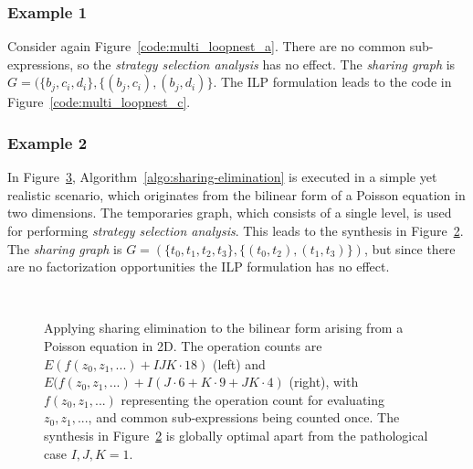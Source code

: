 \subsubsection{Example 1}
Consider again Figure~\ref{code:multi_loopnest_a}. There are no common sub-expressions, so the {\em strategy selection analysis} has no effect. The {\em sharing graph} is $G = (\lbrace b_j, c_i, d_i \rbrace, \lbrace (b_j, c_i), (b_j, d_i) \rbrace$. The ILP formulation leads to the code in Figure~\ref{code:multi_loopnest_c}.

\subsubsection{Example 2}
In Figure~\ref{code:poisson}, Algorithm~\ref{algo:sharing-elimination} is executed in a simple yet realistic scenario, which originates from the bilinear form of a Poisson equation in two dimensions. The temporaries graph, which consists of a single level, is used for performing {\em strategy selection analysis}. This leads to the synthesis in Figure~\ref{code:poisson_b}. The {\em sharing graph} is $G = (\lbrace t_0, t_1, t_2, t_3 \rbrace, \lbrace (t_0, t_2), (t_1, t_3) \rbrace)$, but since there are no factorization opportunities the ILP formulation has no effect.

\begin{figure}[h]
\begin{CenteredBox}
\begin{subfigure}{0.40\textwidth}

\label{code:poisson_a}
\end{subfigure}
~~~~~~~~~~
\begin{subfigure}{0.40\textwidth}

\label{code:poisson_b}
\end{subfigure}

\end{CenteredBox}
\caption{Applying sharing elimination to the bilinear form arising from a Poisson equation in 2D. The operation counts are $E(f(z_0, z_1, ...) + IJK \cdot 18)$ (left) and $E(f(z_0, z_1, ...) + I(J \cdot 6 + K \cdot 9 + JK \cdot 4)$ (right), with $f(z_0, z_1, ...)$ representing the operation count for evaluating $z_0, z_1, ...$, and common sub-expressions being counted once. The synthesis in Figure~\ref{code:poisson_b} is globally optimal apart from the pathological case  $I, J, K = 1$.}
\label{code:poisson}
\end{figure}

